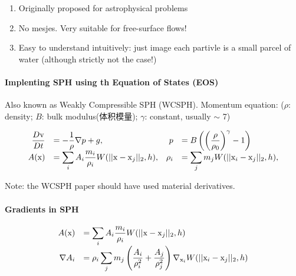 \documentclass[11pt]{article}
\providecommand{\tightlist}{%
      \setlength{\itemsep}{0pt}\setlength{\parskip}{0pt}}
\begin{document}
\begin{enumerate}
\def\labelenumi{\arabic{enumi}.}
\tightlist
\item
  Originally proposed for astrophysical problems
\item
  No mesjes. Very suitable for free-surface flows!
\item
  Easy to understand intuitively: just image each partivle is a small
  parcel of water (although strictly not the case!)
\end{enumerate}

\hypertarget{implenting-sph-using-th-equation-of-states-eos}{%
\paragraph{Implenting SPH using th Equation of States
(EOS)}\label{implenting-sph-using-th-equation-of-states-eos}}

Also known as Weakly Compressible SPH (WCSPH). Momentum equation:
(\(\rho\): density; \(B\): bulk modulus(体积模量); \(\gamma\): constant,
usually \(\sim\) 7)

\begin{equation*}
\begin{array}{rlrl}
\displaystyle\frac{D{\rm v}}{Dt}&=-\displaystyle\frac{1}{\rho}\nabla p+g,
 &p&=B\left(\left(\displaystyle\frac{\rho}{\rho_{0}}\right)^{\gamma}-1\right) \\
A({\rm x})&=\displaystyle\sum_{i}A_{i}\displaystyle\frac{m_{i}}{\rho_{i}}W(||{\rm x - x}_{j}||_{2}, h),
 &\rho_{i}&=\displaystyle\sum_{j}m_{j}W(||{\rm x}_ {i} - {\rm x} _{j}||_{2}, h),
\end{array}
\end{equation*}

Note: the WCSPH paper should have used material derivatives.

\hypertarget{gradients-in-sph}{%
\paragraph{Gradients in SPH}\label{gradients-in-sph}}

\begin{equation*}
\begin{array}{rl}
A({\rm x})&=\displaystyle\sum_{i}A_{i}\displaystyle\frac{m_{i}}{\rho_{i}}W(||{\rm x - x}_{j}||_{2}, h) \\
\nabla A_{i}&=\rho_{i}\displaystyle\sum_{j}m_{j}
               \left(\displaystyle\frac{A_{i}}{\rho_{i}^{2}}+\displaystyle\frac{A_{j}}{\rho_{j}^{2}}\right)
               \nabla_{{\rm x}_{i}} W(||{\rm x}_ {i} - {\rm x} _{j}||_{2}, h)
\end{array}
\end{equation*}
\end{document}
